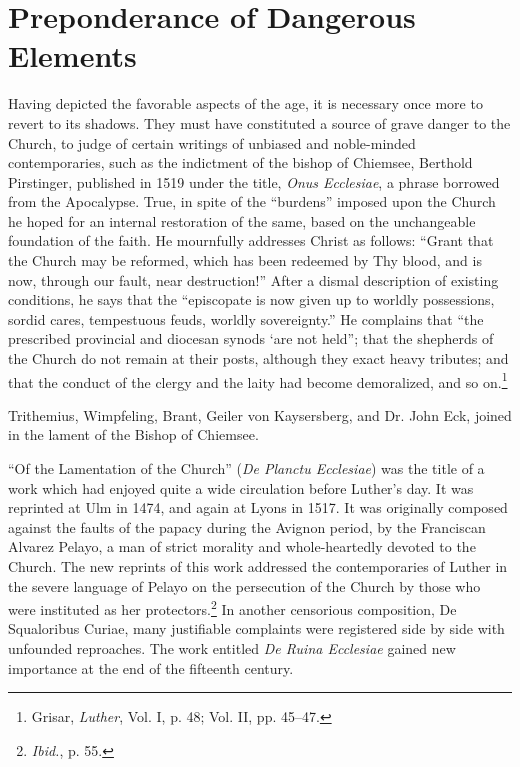 \section{Preponderance of Dangerous Elements}

Having depicted the favorable aspects of the age, it is necessary
once more to revert to its shadows. They must have constituted a
source of grave danger to the Church, to judge of certain writings
of unbiased and noble-minded contemporaries, such as the indictment of
the bishop of Chiemsee, Berthold Pirstinger, published in
1519 under the title, \textit{Onus Ecclesiae}, a phrase borrowed from the
Apocalypse. True, in spite of the “burdens” imposed upon the Church
he hoped for an internal restoration of the same, based on the unchangeable
foundation of the faith. He mournfully addresses Christ
as follows: “Grant that the Church may be reformed, which has
been redeemed by Thy blood, and is now, through our fault, near
destruction!” After a dismal description of existing conditions, he
says that the “episcopate is now given up to worldly possessions,
sordid cares, tempestuous feuds, worldly sovereignty.” He complains
that “the prescribed provincial and diocesan synods ‘are not held”;
that the shepherds of the Church do not remain at their posts, although
they exact heavy tributes; and that the conduct of the clergy
and the laity had become demoralized, and so on.\footnote
{Grisar, \textit{Luther}, Vol. I, p. 48; Vol. II, pp. 45--47.}

Trithemius, Wimpfeling, Brant, Geiler von Kaysersberg, and Dr.
John Eck, joined in the lament of the Bishop of Chiemsee.

“Of the Lamentation of the Church” (\textit{De Planctu Ecclesiae})
was the title of a work which had enjoyed quite a wide circulation
before Luther’s day. It was reprinted at Ulm in 1474, and again at
Lyons in 1517. It was originally composed against the faults of
the papacy during the Avignon period, by the Franciscan Alvarez
Pelayo, a man of strict morality and whole-heartedly devoted to the
Church. The new reprints of this work addressed the contemporaries
of Luther in the severe language of Pelayo on the persecution of
the Church by those who were instituted as her protectors.\footnote{\textit{Ibid.}, p. 55.}
In another censorious composition, De Squaloribus Curiae, many justifiable
complaints were registered side by side with unfounded reproaches. The
work entitled \textit{De Ruina Ecclesiae} gained new importance
at the end of the fifteenth century.

